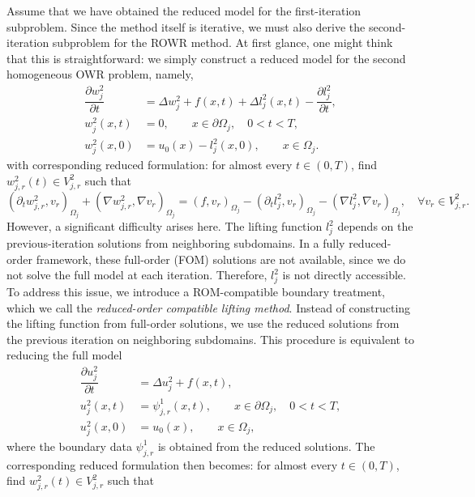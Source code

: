 \documentclass[a4paper, 11pt]{article}
\theoremstyle{remark}
\begin{document}
\vspace{10pt}
\noindent Assume that we have obtained the reduced model for the first-iteration subproblem. Since the method itself is iterative, we must also derive the second-iteration subproblem for the ROWR method. At first glance, one might think that this is straightforward: we simply construct a reduced model for the second homogeneous OWR problem, namely,
\begin{align*}
    \dfrac{\partial w_{j}^{2}}{\partial t} &= \Delta w_{j}^{2} + f(x, t) + \Delta l_{j}^{2}(x, t) - \dfrac{\partial l_{j}^{2}}{\partial t},\\
    w_{j}^{2}(x, t) &= 0, \qquad x\in \partial\Omega_{j}, \quad 0<t<T,\\
    w_{j}^{2}(x, 0) &= u_{0}(x) - l_{j}^{2}(x, 0), \qquad x\in \Omega_{j}.
\end{align*}
with corresponding reduced formulation: for almost every $t \in (0,T)$, find $w_{j, r}^{2}(t) \in V^{2}_{j, r}$ such that
\begin{equation*}
    \left(\partial_{t} w_{j, r}^{2}, v_{r}\right)_{\Omega_{j}} + \left(\nabla w_{j, r}^{2}, \nabla v_{r}\right)_{\Omega_{j}} = \left(f, v_{r}\right)_{\Omega_{j}} - \left(\partial_{t} l_{j}^{2}, v_{r}\right)_{\Omega_{j}} - \left(\nabla l_{j}^{2}, \nabla v_{r}\right)_{\Omega_{j}}, \quad\forall v_{r}\in V^{2}_{j, r}.
\end{equation*}
However, a significant difficulty arises here. The lifting function $l_{j}^{2}$ depends on the previous-iteration solutions from neighboring subdomains. In a fully reduced-order framework, these full-order (FOM) solutions are not available, since we do not solve the full model at each iteration. Therefore, $l_{j}^{2}$ is not directly accessible. To address this issue, we introduce a ROM-compatible boundary treatment, which we call the \textit{reduced-order compatible lifting method}. Instead of constructing the lifting function from full-order solutions, we use the reduced solutions from the previous iteration on neighboring subdomains. This procedure is equivalent to reducing the full model 
\begin{align*}
    \dfrac{\partial u_{j}^{2}}{\partial t} &= \Delta u_{j}^{2} + f(x, t),\\
    u_{j}^{2}(x, t) &= \psi_{j, r}^{1}(x, t), \qquad x\in \partial\Omega_{j}, \quad 0<t<T,\\
    u_{j}^{2}(x, 0) &= u_{0}(x), \qquad x\in \Omega_{j},
\end{align*}
where the boundary data $\psi_{j, r}^{1}$ is obtained from the reduced solutions. The corresponding reduced formulation then becomes: for almost every $t \in (0,T)$, find $w_{j, r}^{2}(t) \in V^{2}_{j, r}$ such that
\end{document}
